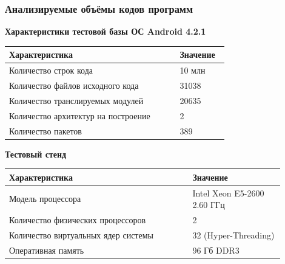 \documentclass[10pt,gray]{beamer}
\begin{document}
\begin{frame}
\frametitle{Анализируемые объёмы кодов программ}
\textbf{Характеристики тестовой базы ОС Android 4.2.1}
\begin{table} [htbp]
  \centering
  \parbox{15cm}{\label{table:android-char}}
  \begin{tabular}{| p{0.7\linewidth} || p{0.2\linewidth} |}
  \hline
  \hline
  \textbf{Характеристика}   & \textbf{Значение} \\
  \hline
  \hline
  Количество строк кода   & 10 млн \\
  \hline
  Количество файлов исходного кода      & 31038    \\
  \hline
  Количество транслируемых модулей  & 20635   \\
  \hline
  Количество архитектур на построение & 2   \\
  \hline
  Количество пакетов & 389 \\
  \hline
  \hline
  \end{tabular}
\end{table}
\textbf{Тестовый стенд}
\begin{table} [htbp]
  \begin{tabular}{| p{0.6\linewidth} || p{0.3\linewidth} |}
  \hline
  \hline
  Характеристика   & Значение \\
  \hline
  \hline
  Модель процессора   & Intel Xeon E5-2600 2.60 ГГц \\
  \hline
  Количество физических процессоров & 2   \\
  \hline
  Количество виртуальных ядер системы & 32 (Hyper-Threading)   \\
  \hline
  Оперативная память & 96 Гб DDR3 \\
  \hline
  \hline
  \end{tabular}
\end{table}

\end{frame}
\end{document}
